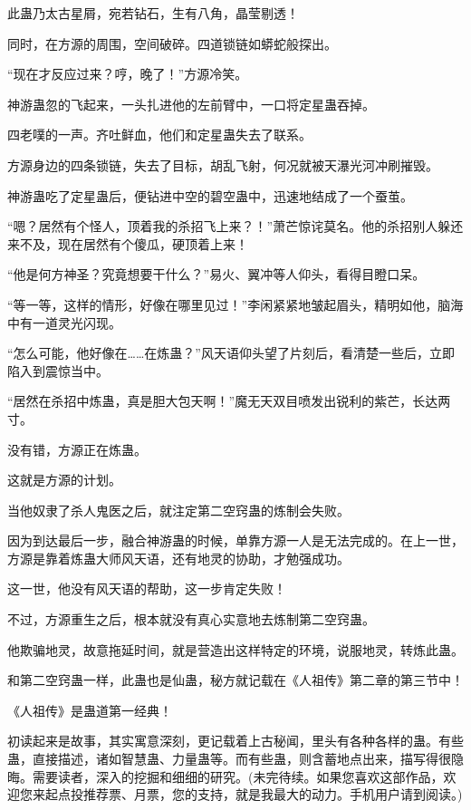 \begin{this_body}
此蛊乃太古星屑，宛若钻石，生有八角，晶莹剔透！

同时，在方源的周围，空间破碎。四道锁链如蟒蛇般探出。

“现在才反应过来？哼，晚了！”方源冷笑。

神游蛊忽的飞起来，一头扎进他的左前臂中，一口将定星蛊吞掉。

四老噗的一声。齐吐鲜血，他们和定星蛊失去了联系。

方源身边的四条锁链，失去了目标，胡乱飞射，何况就被天瀑光河冲刷摧毁。

神游蛊吃了定星蛊后，便钻进中空的碧空蛊中，迅速地结成了一个蚕茧。

“嗯？居然有个怪人，顶着我的杀招飞上来？！”萧芒惊诧莫名。他的杀招别人躲还来不及，现在居然有个傻瓜，硬顶着上来！

“他是何方神圣？究竟想要干什么？”易火、翼冲等人仰头，看得目瞪口呆。

“等一等，这样的情形，好像在哪里见过！”李闲紧紧地皱起眉头，精明如他，脑海中有一道灵光闪现。

“怎么可能，他好像在……在炼蛊？”风天语仰头望了片刻后，看清楚一些后，立即陷入到震惊当中。

“居然在杀招中炼蛊，真是胆大包天啊！”魔无天双目喷发出锐利的紫芒，长达两寸。

没有错，方源正在炼蛊。

这就是方源的计划。

当他奴隶了杀人鬼医之后，就注定第二空窍蛊的炼制会失败。

因为到达最后一步，融合神游蛊的时候，单靠方源一人是无法完成的。在上一世，方源是靠着炼蛊大师风天语，还有地灵的协助，才勉强成功。

这一世，他没有风天语的帮助，这一步肯定失败！

不过，方源重生之后，根本就没有真心实意地去炼制第二空窍蛊。

他欺骗地灵，故意拖延时间，就是营造出这样特定的环境，说服地灵，转炼此蛊。

和第二空窍蛊一样，此蛊也是仙蛊，秘方就记载在《人祖传》第二章的第三节中！

《人祖传》是蛊道第一经典！

初读起来是故事，其实寓意深刻，更记载着上古秘闻，里头有各种各样的蛊。有些蛊，直接描述，诸如智慧蛊、力量蛊等。而有些蛊，则含蓄地点出来，描写得很隐晦。需要读者，深入的挖掘和细细的研究。(未完待续。如果您喜欢这部作品，欢迎您来起点投推荐票、月票，您的支持，就是我最大的动力。手机用户请到阅读。)

\end{this_body}

